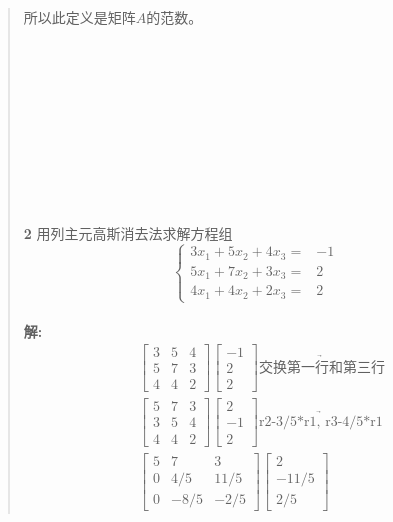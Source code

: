 \documentclass[UTF8]{ctexart}
\begin{document}
\begin{quote}
所以此定义是矩阵$A$的范数。
\\
\\
\\
\\
\\
\\
\\
\\
\\
\\
\\
\textbf{2 } 用列主元高斯消去法求解方程组
\begin{equation}
	\left\{
		\begin{aligned}
			3x_{1}+5x_{2}+4x_{3}=&-1\\
			5x_{1}+7x_{2}+3x_{3}=&2 \\
			4x_{1}+4x_{2}+2x_{3}=&2
		\end{aligned}
	\right.
\end{equation}
\\
\textbf{解:}\\
\begin{equation}
	\begin{aligned}
		&
		\begin{bmatrix}
			3 &5& 4\\ 5 & 7 & 3\\ 4 &4 &2
		\end{bmatrix}
		\begin{bmatrix}
			-1 \\ 2 \\2
		\end{bmatrix}
		\underrightarrow{\text{交换第一行和第三行}}\\
		&\begin{bmatrix}
			5&7& 3\\ 3 & 5 & 4\\ 4 &4 &2
		\end{bmatrix}
		\begin{bmatrix}
			2 \\ -1 \\ 2
		\end{bmatrix}
		\underrightarrow{\text{r2-3/5*r1, r3-4/5*r1}}\\
		&\begin{bmatrix}
			5&7& 3\\ 0 & 4/5 & 11/5\\ 0 &-8/5 &-2/5
		\end{bmatrix}
		\begin{bmatrix}
			2 \\ -11/5 \\ 2/5

\end{bmatrix}
\end{aligned}
\end{equation}
\end{quote}
\end{document}
